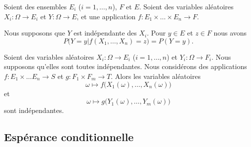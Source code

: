 \begin{lemma}            \label{LEMooZTBSooLemswG}
    Soient des ensembles \( E_i\) (\( i=1,\ldots, n\)), \( F\) et \( E\). Soient des variables aléatoires \( X_i\colon \Omega\to E_i\) et \( Y\colon \Omega\to E\), et une application \( f\colon E_1\times \ldots\times E_n\to F\).

    Nous supposons que \( Y\) est indépendante des \( X_i\). Pour \( y\in E\) et \( z\in F\) nous avons
    \begin{equation}
        P\big( Y=y|f(X_1,\ldots, X_n)=z \big)=P(Y=y).
    \end{equation}
\end{lemma}

\begin{lemma}        \label{LEMooWAOSooBsGucQ}
    Soient des variables aléatoires \( X_i\colon \Omega\to E_i\) (\( i=1,\ldots, n\)) et \( Y_i\colon \Omega\to F_i\). Nous supposons qu'elles sont toutes indépendantes. Nous considérons des applications \( f\colon E_1\times \ldots E_n\to S\) et \( g\colon F_1\times F_m\to T\). Alors les variables aléatoires
    \begin{equation}
        \omega\mapsto f\big( X_1(\omega),\ldots, X_n(\omega) \big)
    \end{equation}
    et
    \begin{equation}
        \omega\mapsto g\big( Y_1(\omega),\ldots, Y_m(\omega) \big)
    \end{equation}
    sont indépendantes.
\end{lemma}

\subsection{Espérance conditionnelle}

